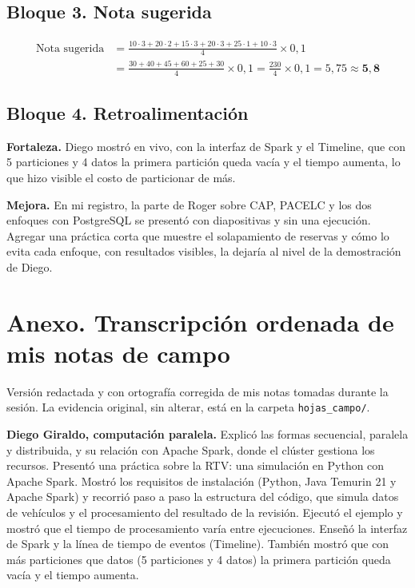 \documentclass[11pt,a4paper]{article}
\begin{document}
\subsection*{Bloque 3. Nota sugerida}
\begin{align*}
\text{Nota sugerida} &= \frac{10\cdot3 + 20\cdot2 + 15\cdot3 + 20\cdot3 + 25\cdot1 + 10\cdot3}{4}\times 0{,}1\\[4pt]
&= \frac{30+40+45+60+25+30}{4}\times 0{,}1 = \frac{230}{4}\times 0{,}1 = 5{,}75 \approx \mathbf{5{,}8}
\end{align*}

\subsection*{Bloque 4. Retroalimentación}
\textbf{Fortaleza.} Diego mostró en vivo, con la interfaz de Spark y el Timeline, que con 5 particiones y 4 datos la primera partición queda vacía y el tiempo aumenta, lo que hizo visible el costo de particionar de más.

\textbf{Mejora.} En mi registro, la parte de Roger sobre CAP, PACELC y los dos enfoques con PostgreSQL se presentó con diapositivas y sin una ejecución. Agregar una práctica corta que muestre el solapamiento de reservas y cómo lo evita cada enfoque, con resultados visibles, la dejaría al nivel de la demostración de Diego.

\section*{Anexo. Transcripción ordenada de mis notas de campo}
Versión redactada y con ortografía corregida de mis notas tomadas durante la sesión. La evidencia original, sin alterar, está en la carpeta \texttt{hojas\_campo/}.

\textbf{Diego Giraldo, computación paralela.} Explicó las formas secuencial, paralela y distribuida, y su relación con Apache Spark, donde el clúster gestiona los recursos. Presentó una práctica sobre la RTV: una simulación en Python con Apache Spark. Mostró los requisitos de instalación (Python, Java Temurin 21 y Apache Spark) y recorrió paso a paso la estructura del código, que simula datos de vehículos y el procesamiento del resultado de la revisión. Ejecutó el ejemplo y mostró que el tiempo de procesamiento varía entre ejecuciones. Enseñó la interfaz de Spark y la línea de tiempo de eventos (Timeline). También mostró que con más particiones que datos (5 particiones y 4 datos) la primera partición queda vacía y el tiempo aumenta.
\end{document}

